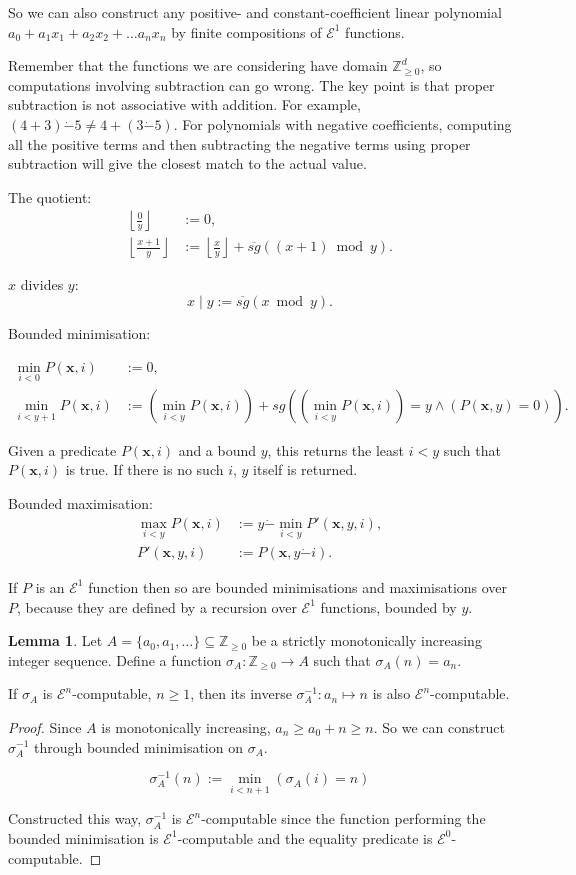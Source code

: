 \documentclass[a4paper]{article}
\newcommand{\grz}[1]{$\mathcal{E}^{#1}$}	%
\newcommand{\ZZ}{\mathbb{Z}}
\newcommand{\xvec}{\mathbf{x}}	%
\newcommand{\psub}{\dot -}	%
\newcommand{\rsg}{\overline{sg}} %
\newcommand{\recur}[1]{\begin{equation} \begin{split} #1 \end{split} \end{equation}}	%
\theoremstyle{plain}
\theoremstyle{definition}
\newtheorem{lemma}[theorem]{Lemma}
\begin{document}
	So we can also construct any positive- and constant-coefficient linear polynomial $a_0 + a_1x_1 + a_2x_2 + \dots a_nx_n$ by finite compositions of \grz{1} functions. 

Remember that the functions we are considering have domain $\ZZ_{\geq 0}^d$, so computations involving subtraction can go wrong. The key point is that proper subtraction is not associative with addition. For example, $(4+3) \psub 5 \neq 4+(3 \psub 5)$. For polynomials with negative coefficients, computing all the positive terms and then subtracting the negative terms using proper subtraction will give the closest match to the actual value.

The quotient:
\recur{
	\left \lfloor \frac{0}{y} \right \rfloor &:= 0, \\
	\left \lfloor \frac{x+1}{y} \right \rfloor &:= \left \lfloor \frac{x}{y} \right \rfloor + \rsg\left( (x+1) \bmod{y} \right).
}

$x$ divides $y$:
\begin{equation} x \mid y := \rsg( x \bmod{y} ). \end{equation}

Bounded minimisation: 

\recur{
	\min_{i < 0} P(\xvec,i) &:= 0,	\\
	\min_{i < y+1} P(\xvec,i) &:= \left( \min_{i  < y} P(\xvec,i) \right) + sg\left( (\min_{i<y}P(\xvec,i))=y \wedge (P(\xvec,y) = 0) \right).
}

Given a predicate $P(\xvec,i)$ and a bound $y$, this returns the least $i<y$ such that $P(\xvec,i)$ is true. If there is no such $i$, $y$ itself is returned.

Bounded maximisation:
\recur{
	\max_{i < y} P(\xvec,i) &:= y \psub \min_{i < y} P'(\xvec, y, i), \\
	P'(\xvec,y,i) &:= P(\xvec, y \psub i).
}

If $P$ is an \grz{1} function then so are bounded minimisations and maximisations over $P$, because they are defined by a recursion over \grz{1} functions, bounded by $y$.

\begin{lemma}
	Let $A = \{a_0, a_1, \dots\} \subseteq \ZZ_{\geq 0}$ be a strictly monotonically increasing integer sequence. Define a function $\sigma_A : \ZZ_{\geq 0} \to A$ such that $\sigma_A(n) = a_n$.
	
	If $\sigma_A$ is \grz{n}-computable, $n \geq 1$, then its inverse $\sigma_A^{-1} : a_n \mapsto n$ is also \grz{n}-computable. 
\end{lemma}
\begin{proof}
	Since $A$ is monotonically increasing, $a_n \geq a_0 + n \geq n$. So we can construct $\sigma_A^{-1}$ through bounded minimisation on $\sigma_A$.

	\[ \sigma_A^{-1}(n) := \min_{i < n+1}{\left( \sigma_A(i) = n \right)} \]

	Constructed this way, $\sigma_A^{-1}$ is \grz{n}-computable since the function performing the bounded minimisation is \grz{1}-computable and the equality predicate is \grz{0}-computable. 
\end{proof}
\end{document}
